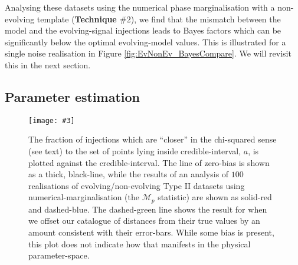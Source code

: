\documentclass[prd,twocolumn,showpacs,nofootinbib]{revtex4}
\newcommand{\incgraph}[3]{\texttt{[image: \#3]}}
\begin{document}


Analysing these datasets using the numerical phase marginalisation with a non-evolving template ({\bf Technique $\#2$}), we find that the mismatch between the model and the evolving-signal injections leads to Bayes factors which can be significantly below the optimal evolving-model values. This is illustrated for a single noise realisation in Figure \ref{fig:EvNonEv_BayesCompare}. We will revisit this in the next section.

\subsection{Parameter estimation}\label{sec:param-estimate}

\begin{figure}
  \centering
  \incgraph{0}{0.5}{P-P_plot_15-06-2014.pdf}
   \caption{\label{fig:T4pp}The fraction of injections which are ``closer'' in the chi-squared sense (see text) to the set of points lying inside credible-interval, $a$, is plotted against the credible-interval. The line of zero-bias is shown as a thick, black-line, while the results of an analysis of $100$ realisations of evolving/non-evolving Type II datasets using numerical-marginalisation (the {\bf $\mathcal{M}_p$} statistic) are shown as solid-red and dashed-blue. The dashed-green line shows the result for when we offset our catalogue of distances from their true values by an amount consistent with their error-bars. While some bias is present, this plot does not indicate how that manifests in the physical parameter-space.} 
 \end{figure}
\end{document}
